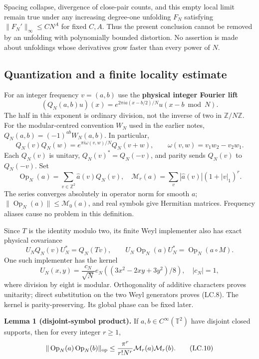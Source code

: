 Spacing collapse, divergence of close-pair counts, and this empty local limit remain true under any increasing degree-one unfolding \(F_N\) satisfying \(\|F_N'\|_\infty\leq C N^A\) for fixed \(C,A\). Thus the present conclusion cannot be removed by an unfolding with polynomially bounded distortion. No assertion is made about unfoldings whose derivatives grow faster than every power of \(N\).

\subsection{Quantization and a finite locality estimate}\label{locality:quantization-and-a-finite-locality-estimate}

For an integer frequency \(v=(a,b)\) use the \textbf{physical integer Fourier lift} \[
 (Q_N(a,b)u)(x)=e^{2\pi ia(x-b/2)/N}u(x-b\bmod N).
\] The half in this exponent is ordinary division, not the inverse of two in \(\mathbb Z/N\mathbb Z\). For the modular-centred convention \(W_N\) used in the earlier notes, \(Q_N(a,b)=(-1)^{ab}W_N(a,b)\). In particular, \[
 Q_N(v)Q_N(w)=e^{\pi i\omega(v,w)/N}Q_N(v+w),\qquad
 \omega(v,w)=v_1w_2-v_2w_1.                                 \tag{LC.7}
\] Each \(Q_N(v)\) is unitary, \(Q_N(v)^*=Q_N(-v)\), and parity sends \(Q_N(v)\) to \(Q_N(-v)\). Set \[
 \operatorname{Op}_N(a)=\sum_{v\in\mathbb Z^2}\widehat a(v)Q_N(v),
 \quad \mathcal M_r(a)=\sum_v|\widehat a(v)|(1+|v|_1)^r.
\] The series converges absolutely in operator norm for smooth \(a\); \(\|\operatorname{Op}_N(a)\|\leq\mathcal M_0(a)\), and real symbols give Hermitian matrices. Frequency aliases cause no problem in this definition.

Since \(T\) is the identity modulo two, its finite Weyl implementer also has exact physical covariance \[
 U_NQ_N(v)U_N^*=Q_N(Tv),\qquad
 U_N\operatorname{Op}_N(a)U_N^*=\operatorname{Op}_N(a\circ M). \tag{LC.8}
\] One such implementer has the kernel \[
 U_N(x,y)=\frac{c_N}{\sqrt N}
 e_N\!\left((3x^2-2xy+3y^2)/8\right),\quad |c_N|=1,         \tag{LC.9}
\] where division by eight is modular. Orthogonality of additive characters proves unitarity; direct substitution on the two Weyl generators proves (LC.8). The kernel is parity-preserving. Its global phase can be fixed later.

\textbf{Lemma 1 (disjoint-symbol product).} If \(a,b\in C^\infty(\mathbb T^2)\) have disjoint closed supports, then for every integer \(r\geq1\), \[
 \|\operatorname{Op}_N(a)\operatorname{Op}_N(b)\|_{\rm op}
 \leq\frac{\pi^r}{r!N^r}\mathcal M_r(a)\mathcal M_r(b).       \tag{LC.10}
\]

